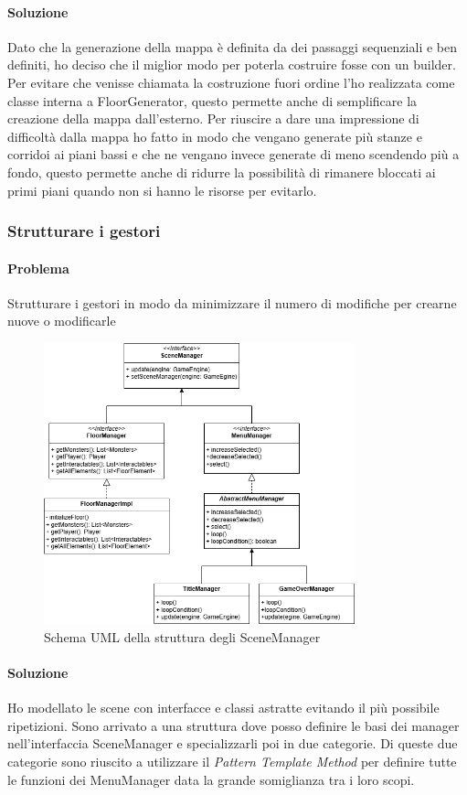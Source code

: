\documentclass{report}
\begin{document}
\paragraph{Soluzione} Dato che la generazione della mappa è definita da dei passaggi sequenziali e ben definiti, ho deciso che il miglior modo per poterla costruire fosse con un builder.
%
Per evitare che venisse chiamata la costruzione fuori ordine l’ho realizzata come classe interna a FloorGenerator, questo permette anche di semplificare la creazione della mappa dall’esterno.
%
Per riuscire a dare una impressione di difficoltà dalla mappa ho fatto in modo che vengano generate più stanze e corridoi ai piani bassi e che ne vengano invece generate di meno scendendo più a fondo, 
%
questo permette anche di ridurre la possibilità di rimanere bloccati ai primi piani quando non si hanno le risorse per evitarlo.

\subsubsection{Strutturare i gestori}

\paragraph{Problema} Strutturare i gestori in modo da minimizzare il numero di modifiche per crearne nuove o modificarle

\begin{figure}[H]
    \centering
    \includegraphics[width=9cm]{SceneStructureDiagram.png}
    \caption{Schema UML della struttura degli SceneManager}
    \label{img:SceneStructure}
\end{figure}

\paragraph{Soluzione} Ho modellato le scene con interfacce e classi astratte evitando il più possibile ripetizioni.
%
Sono arrivato a una struttura dove posso definire le basi dei manager nell'interfaccia SceneManager e specializzarli poi in due categorie.
%
Di queste due categorie sono riuscito a utilizzare il \textit{Pattern Template Method} per definire tutte le funzioni dei MenuManager data la grande somiglianza tra i loro scopi.
\end{document}
